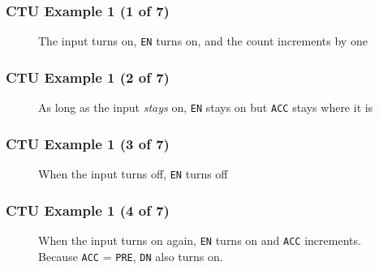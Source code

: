 \begin{frame}
    \frametitle{CTU Example 1 (1 of 7)}

    \begin{figure}
        \centering
        \resizebox{0.875\linewidth}{!}{
            
        }

        \vspace{0.5em}
        {\footnotesize The input turns on, \texttt{EN} turns on, and the count increments by one\par}
    \end{figure}
\end{frame}

\begin{frame}
    \frametitle{CTU Example 1 (2 of 7)}

    \begin{figure}
        \centering
        \resizebox{0.875\linewidth}{!}{
            
        }

        \vspace{0.5em}
        {\footnotesize As long as the input \emph{stays} on, \texttt{EN} stays on but \texttt{ACC} stays where it is\par}
    \end{figure}
\end{frame}

\begin{frame}
    \frametitle{CTU Example 1 (3 of 7)}

    \begin{figure}
        \centering
        \resizebox{0.875\linewidth}{!}{
            
        }

        \vspace{0.5em}
        {\footnotesize When the input turns off, \texttt{EN} turns off\par}
    \end{figure}
\end{frame}

\begin{frame}
    \frametitle{CTU Example 1 (4 of 7)}

    \begin{figure}
        \centering
        \resizebox{0.875\linewidth}{!}{
            
        }

        \vspace{0.5em}
        {\footnotesize When the input turns on again, \texttt{EN} turns on and \texttt{ACC} increments. Because \texttt{ACC} = \texttt{PRE}, \texttt{DN} also turns on.\par}
    \end{figure}
\end{frame}


